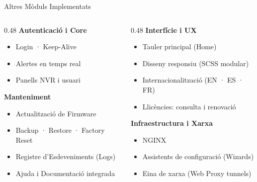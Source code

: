 \begin{frame}{Altres Mòduls Implementats}
  \vspace{0.3em}
  \begin{columns}[T]
    \begin{column}{0.48\textwidth}
      \textbf{\small Autenticació i Core}
      \begin{itemize}\setlength\itemsep{0pt}
        \item[\small$\bullet$] Login · Keep-Alive
        \item[\small$\bullet$] Alertes en temps real
        \item[\small$\bullet$] Panells NVR i usuari
      \end{itemize}

      \vspace{0.5em}
      \textbf{\small Manteniment}
      \begin{itemize}\setlength\itemsep{0pt}
        \item[\small$\bullet$] Actualització de Firmware
        \item[\small$\bullet$] Backup · Restore · Factory Reset
        \item[\small$\bullet$] Registre d'Esdeveniments (Logs)
        \item[\small$\bullet$] Ajuda i Documentació integrada
      \end{itemize}
    \end{column}

    \begin{column}{0.48\textwidth}
      \textbf{\small Interfície i UX}
      \begin{itemize}\setlength\itemsep{0pt}
        \item[\small$\bullet$] Tauler principal (Home)
        \item[\small$\bullet$] Disseny responsiu (SCSS modular)
        \item[\small$\bullet$] Internacionalització (EN · ES · FR)
        \item[\small$\bullet$] Llicències: consulta i renovació
      \end{itemize}

      \vspace{0.5em}
      \textbf{\small Infraestructura i Xarxa}
      \begin{itemize}\setlength\itemsep{0pt}
        \item[\small$\bullet$] NGINX
        \item[\small$\bullet$] Assistents de configuració (Wizards)
        \item[\small$\bullet$] Eina de xarxa (Web Proxy tunnels)
      \end{itemize}
    \end{column}
  \end{columns}
\end{frame}
